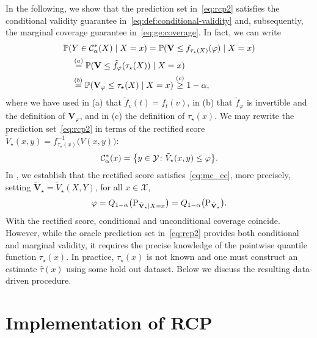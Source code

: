   In the following, we show that the prediction set in~\eqref{eq:rcp2} satisfies the conditional validity guarantee in~\eqref{eq:def:conditional-validity} and, subsequently, the marginal coverage guarantee in~\eqref{eq:ge:coverage}. In fact, we can write
  \begin{align*}
    &\mathbb{P}( Y \in \mathcal{C}_{\alpha}^*(X) \mid X=x) = \mathbb{P}(\mathbf{V} \leq f_{\tau_\star(X)}(\varphi) \mid X=x) \\
    & \quad \stackrel{(a)}{=} \mathbb{P}(\mathbf{V} \leq \tilde{f}_{\varphi}
    (\tau_\star(X)) \mid X=x) \\
    & \quad \stackrel{(b)}{=}\mathbb{P}( \mathbf{V}_\varphi \leq \tau_\star(X) \mid X=x) \stackrel{(c)}{\geq} 1 - \alpha, 
  \end{align*}
  where we have used in (a) that $\tilde{f}_v(t)= f_t(v)$, in (b) that $\tilde{f}_\varphi$ is invertible and the definition of $\mathbf{V}_\varphi$, and in (c) the definition of $\tau_\star(x)$. We may rewrite the prediction set~\eqref{eq:rcp2} in terms of the rectified score 
  $\tilde{V}_\star(x,y)= f_{\tau_\star(x)}^{-1}\bigl(V(x,y)\bigr)$: 
  \begin{equation}
  \label{eq:rcp2-rectified}
      \mathcal{C}_{\alpha}^*(x) = \bigl\{y \in \mathcal{Y}\colon \tilde{V}_\star(x, y) \leq \varphi\bigr\}.
  \end{equation}
  In , we establish that the rectified score satisfies~\eqref{eq:mc_cc}, more precisely, setting $\tilde{\mathbf{V}}_\star = \tilde{V}_\star(X,Y)$, for all $x \in \mathcal{X}$, 
  \begin{equation}
  \label{eq:key-relation}
    \varphi = Q_{1-\alpha}\bigl(\textup{P}_{\tilde{\mathbf{V}}_\star|X=x}\bigr) = Q_{1-\alpha}\bigl(\textup{P}_{\tilde{\mathbf{V}}_\star}\bigr).
  \end{equation}
  With the rectified score, conditional and unconditional coverage coincide. However, while the oracle prediction set in~\eqref{eq:rcp2} provides both conditional and marginal validity, it requires the precise knowledge of the pointwise quantile function $\tau_\star(x)$. In practice, $\tau_\star(x)$  is not known and one must construct an estimate \(\widehat{\tau}(x)\) using some hold out dataset. Below we discuss the resulting data-driven procedure.

\vspace{-15pt}
\section{Implementation of RCP}


